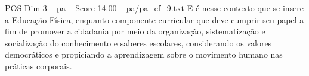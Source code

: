 \begin{textsample}{POS Dim 3 – pa – Score 14.00 – pa/pa\_ef\_9.txt}
E é nesse contexto que se insere a Educação Física, enquanto componente curricular que deve cumprir seu papel a fim de promover a cidadania por meio da organização, sistematização e socialização do conhecimento e saberes escolares, considerando os valores democráticos e propiciando a aprendizagem sobre o movimento humano nas práticas corporais.

\end{textsample}
